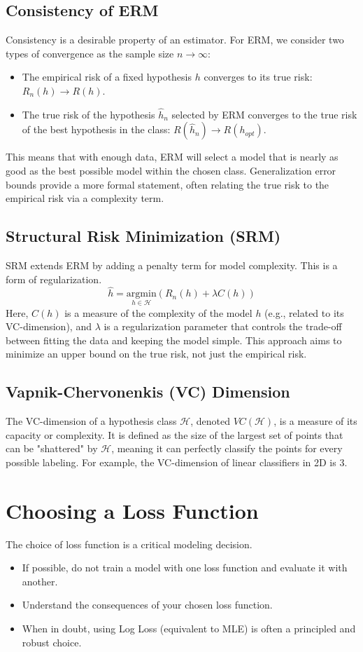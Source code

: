 \documentclass{article}
\begin{document}
\begin{multicols}{2}
	\subsection{Consistency of ERM}
	Consistency is a desirable property of an estimator. For ERM, we consider two types of convergence as the sample size $n \to \infty$:
	\begin{itemize}
		\item The empirical risk of a fixed hypothesis $h$ converges to its true risk: $R_n(h) \to R(h)$.
		\item The true risk of the hypothesis $\hat{h}_n$ selected by ERM converges to the true risk of the best hypothesis in the class: $R(\hat{h}_n) \to R(h_{opt})$.
	\end{itemize}
	This means that with enough data, ERM will select a model that is nearly as good as the best possible model within the chosen class. Generalization error bounds provide a more formal statement, often relating the true risk to the empirical risk via a complexity term.

	\subsection{Structural Risk Minimization (SRM)}
	SRM extends ERM by adding a penalty term for model complexity. This is a form of regularization.
	$$ \hat{h} = \underset{h \in \mathcal{H}}{\text{argmin}} \left( R_n(h) + \lambda C(h) \right) $$
	Here, $C(h)$ is a measure of the complexity of the model $h$ (e.g., related to its VC-dimension), and $\lambda$ is a regularization parameter that controls the trade-off between fitting the data and keeping the model simple. This approach aims to minimize an upper bound on the true risk, not just the empirical risk.

	\subsection{Vapnik-Chervonenkis (VC) Dimension}
	The VC-dimension of a hypothesis class $\mathcal{H}$, denoted $VC(\mathcal{H})$, is a measure of its capacity or complexity. It is defined as the size of the largest set of points that can be "shattered" by $\mathcal{H}$, meaning it can perfectly classify the points for every possible labeling. For example, the VC-dimension of linear classifiers in 2D is 3.

	\section{Choosing a Loss Function}
	The choice of loss function is a critical modeling decision.
	\begin{itemize}
		\item If possible, do not train a model with one loss function and evaluate it with another.
		\item Understand the consequences of your chosen loss function.
		\item When in doubt, using Log Loss (equivalent to MLE) is often a principled and robust choice.
	\end{itemize}


\end{multicols}
\end{document}
